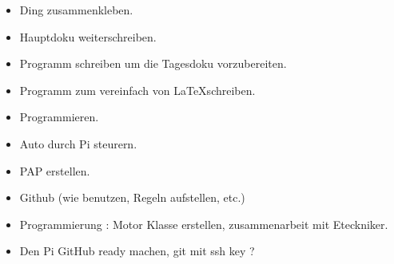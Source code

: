 \documentclass{article}
\begin{document}
\begin{itemize}

\item Ding zusammenkleben.

\item Hauptdoku weiterschreiben.

\item Programm schreiben um die Tagesdoku vorzubereiten.

\item Programm zum vereinfach von \LaTeX schreiben.

\item Programmieren.

\item Auto durch Pi steurern.

\item PAP erstellen.

\item Github (wie benutzen, Regeln aufstellen, etc.)

\item Programmierung : Motor Klasse erstellen, zusammenarbeit mit Eteckniker.

\item Den Pi GitHub ready machen, git mit ssh key ?

\end{itemize}
\end{document}
